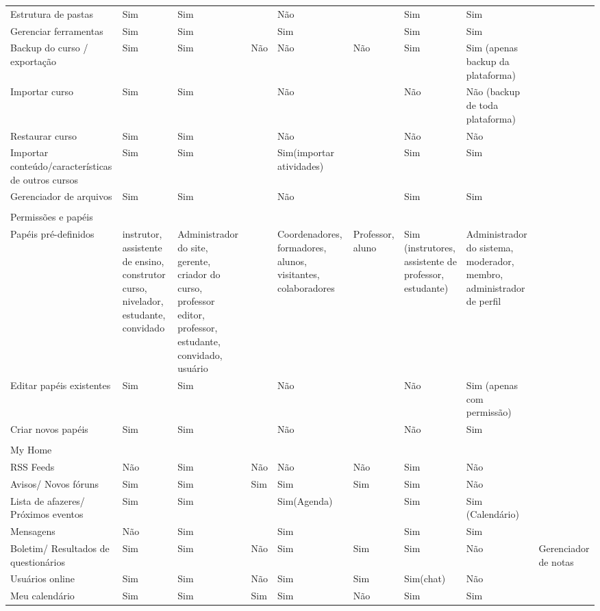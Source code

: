 \begin{table}[!htb]
\begin{tabular}{@{}lllllllll@{}}
Estrutura de pastas & Sim & Sim &  & Não &  & Sim & Sim &  \\
Gerenciar ferramentas & Sim & Sim &  & Sim &  & Sim & Sim &  \\
Backup do curso / exportação & Sim & Sim & Não & Não & Não & Sim & Sim (apenas backup da plataforma) &  \\
Importar curso & Sim & Sim &  & Não &  & Não & Não (backup de toda plataforma) &  \\
Restaurar curso & Sim & Sim &  & Não &  & Não & Não &  \\
Importar conteúdo/características de outros cursos & Sim & Sim &  & Sim(importar atividades) &  & Sim & Sim &  \\
Gerenciador de arquivos & Sim & Sim &  & Não &  & Sim & Sim &  \\
 &  &  &  &  &  &  &  &  \\
Permissões e papéis &  &  &  &  &  &  &  &  \\
Papéis pré-definidos & instrutor, assistente de ensino, construtor curso, nivelador, estudante, convidado & Administrador do site, gerente, criador do curso, professor editor, professor, estudante, convidado, usuário &  & Coordenadores, formadores, alunos, visitantes, colaboradores & Professor, aluno & Sim (instrutores, assistente de professor, estudante) & Administrador do sistema, moderador, membro, administrador de perfil &  \\
Editar papéis existentes & Sim & Sim &  & Não &  & Não & Sim (apenas com permissão) &  \\
Criar novos papéis & Sim & Sim &  & Não &  & Não & Sim &  \\
 &  &  &  &  &  &  &  &  \\
My Home &  &  &  &  &  &  &  &  \\
RSS Feeds & Não & Sim & Não & Não & Não & Sim & Não &  \\
Avisos/ Novos fóruns & Sim & Sim & Sim & Sim & Sim & Sim & Não &  \\
Lista de afazeres/ Próximos eventos & Sim & Sim &  & Sim(Agenda) &  & Sim & Sim (Calendário) &  \\
Mensagens & Não & Sim &  & Sim &  & Sim & Sim &  \\
Boletim/ Resultados de questionários & Sim & Sim & Não & Sim & Sim & Sim & Não & Gerenciador de notas \\
Usuários online & Sim & Sim & Não & Sim & Sim & Sim(chat) & Não &  \\
Meu calendário & Sim & Sim & Sim & Sim & Não & Sim & Sim &  \\

\end{tabular}
\end{table}
